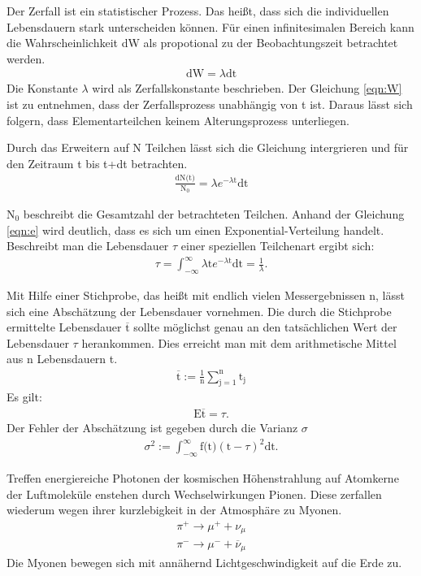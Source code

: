 Der Zerfall ist ein statistischer Prozess. Das heißt, dass sich die individuellen Lebensdauern stark unterscheiden können.
Für einen infinitesimalen Bereich kann die Wahrscheinlichkeit dW als propotional zu der Beobachtungszeit betrachtet werden.
\begin{align}
  \text{dW}=\lambda \text{dt}
  \label{eqn:W}
\end{align}
Die Konstante $\lambda$ wird als Zerfallskonstante beschrieben.
Der Gleichung \ref{eqn:W} ist zu entnehmen, dass der Zerfallsprozess unabhängig von t ist.
Daraus lässt sich folgern, dass Elementarteilchen keinem Alterungsprozess unterliegen.

Durch das Erweitern auf N Teilchen lässt sich die Gleichung intergrieren und für den Zeitraum t bis t+dt betrachten.
\begin{align}
  \frac{\text{dN(t)}}{\text{N}_0}=\lambda e^{-\lambda \text{t}} \text{dt}
  \label{eqn:e}
\end{align}



$\text{N}_0$ beschreibt die Gesamtzahl der betrachteten Teilchen.
Anhand der Gleichung \ref{eqn:e} wird deutlich, dass es sich um einen Exponential-Verteilung handelt.
Beschreibt man die Lebensdauer $\tau$ einer speziellen Teilchenart ergibt sich:
\begin{align*}
  \tau=\int_{-\infty}^{\infty}\lambda \text{t} e^{-\lambda \text{t}}\text{dt}=\frac{1}{\lambda}.
\end{align*}

Mit Hilfe einer Stichprobe, das heißt mit endlich vielen Messergebnissen n, lässt sich eine Abschätzung der Lebensdauer vornehmen.
Die durch die Stichprobe ermittelte Lebensdauer $\overline{\text{t}}$ sollte möglichst genau an den tatsächlichen Wert der Lebensdauer $\tau$ herankommen.
Dies erreicht man mit dem arithmetische Mittel aus n Lebensdauern t.
\begin{align*}
  \overline{\text{t}}:=\frac{1}{\text{n}}\sum_{\text{j}=1}^\text{n}\text{t}_\text{j}
\end{align*}
Es gilt:
\begin{align*}
  \text{E}\overline{\text{t}}=\tau.
\end{align*}
Der Fehler der Abschätzung ist gegeben durch die Varianz $\sigma$
\begin{align*}
  \sigma^2:=\int_{-\infty}^{\infty}\text{f(t)}(\text{t}-\tau)^2\text{dt}.
\end{align*}


Treffen energiereiche Photonen der kosmischen Höhenstrahlung auf Atomkerne der Luftmoleküle enstehen durch Wechselwirkungen
Pionen.
Diese zerfallen wiederum wegen ihrer kurzlebigkeit in der Atmosphäre zu Myonen.
\begin{align*}
  \pi^+ \rightarrow \mu^++\nu_\mu\\
  \pi^- \rightarrow \mu^-+\overline{\nu}_\mu
\end{align*}
Die Myonen bewegen sich mit annähernd Lichtgeschwindigkeit auf die Erde zu.
